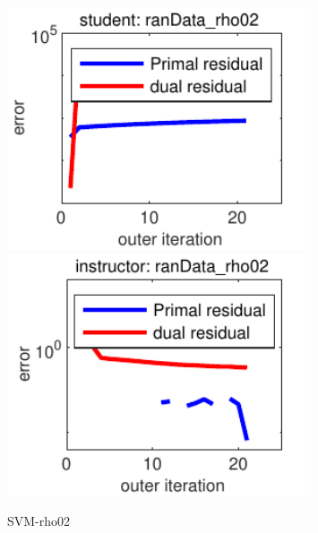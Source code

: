\documentclass[12pt]{article}
\begin{document}
\begin{figure}\caption{SVM-rho02}
\begin{center}
\includegraphics[width=0.8\textwidth]{student_rho02.pdf} 
\includegraphics[width=0.8\textwidth]{instructor_rho02.pdf} 
\end{center}
\end{figure}
\end{document}

